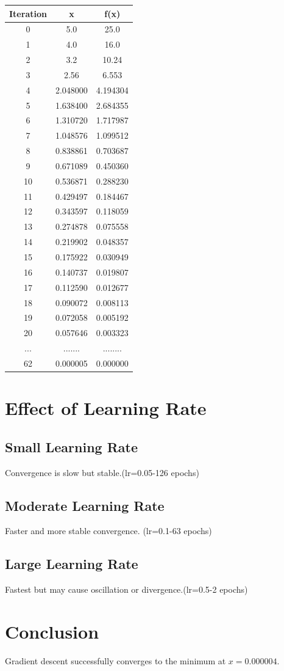 \documentclass{article}
\begin{document}
\begin{center}
\begin{tabular}{ccc}
\toprule
Iteration & x & f(x) \\
\midrule
0 & 5.0 & 25.0 \\
1 & 4.0 & 16.0 \\
2 & 3.2 & 10.24 \\
3 & 2.56 & 6.553 \\
4 &2.048000	& 4.194304 \\
5 &1.638400	 &2.684355 \\
6& 1.310720	& 1.717987\\
7& 1.048576	& 1.099512\\
8& 0.838861	& 0.703687\\
9& 0.671089	& 0.450360\\
10& 0.536871& 0.288230\\
11& 0.429497& 0.184467\\
12& 0.343597& 0.118059\\
13& 0.274878& 0.075558\\
14& 0.219902& 0.048357\\
15& 0.175922& 0.030949\\
16& 0.140737& 0.019807\\
17& 0.112590& 0.012677\\
18& 0.090072& 0.008113\\
19& 0.072058& 0.005192\\
20 &0.057646 & 0.003323\\
...& ....... & ........ \\
62& 0.000005&	 0.000000 \\
\bottomrule
\end{tabular}
\end{center}

\section{Effect of Learning Rate}

\subsection{Small Learning Rate}
Convergence is slow but stable.(lr=0.05-126 epochs)

\subsection{Moderate Learning Rate}
Faster and more stable convergence. (lr=0.1-63 epochs)

\subsection{Large Learning Rate}
Fastest but may cause oscillation or divergence.(lr=0.5-2 epochs)

\section{Conclusion}
Gradient descent successfully converges to the minimum at $x = 0.000004$.
\end{document}
